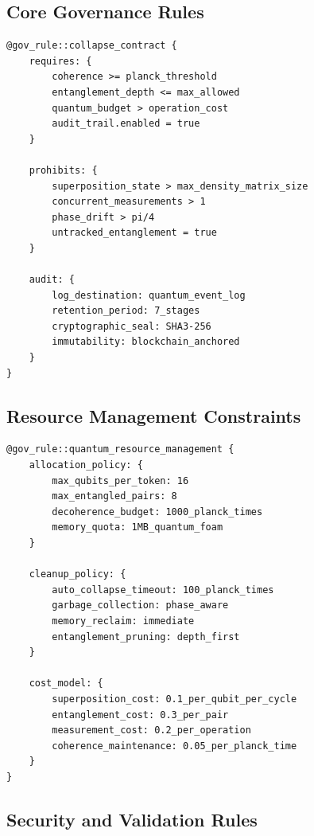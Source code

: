\documentclass[12pt,a4paper]{article}
\begin{document}
\subsection{Core Governance Rules}

\begin{lstlisting}[style=riftlang,caption={Collapse Contract Governance}]
@gov_rule::collapse_contract {
    requires: {
        coherence >= planck_threshold
        entanglement_depth <= max_allowed
        quantum_budget > operation_cost
        audit_trail.enabled = true
    }
    
    prohibits: {
        superposition_state > max_density_matrix_size
        concurrent_measurements > 1
        phase_drift > pi/4
        untracked_entanglement = true
    }
    
    audit: {
        log_destination: quantum_event_log
        retention_period: 7_stages
        cryptographic_seal: SHA3-256
        immutability: blockchain_anchored
    }
}
\end{lstlisting}

\subsection{Resource Management Constraints}

\begin{lstlisting}[style=riftlang,caption={Quantum Resource Governance}]
@gov_rule::quantum_resource_management {
    allocation_policy: {
        max_qubits_per_token: 16
        max_entangled_pairs: 8
        decoherence_budget: 1000_planck_times
        memory_quota: 1MB_quantum_foam
    }
    
    cleanup_policy: {
        auto_collapse_timeout: 100_planck_times
        garbage_collection: phase_aware
        memory_reclaim: immediate
        entanglement_pruning: depth_first
    }
    
    cost_model: {
        superposition_cost: 0.1_per_qubit_per_cycle
        entanglement_cost: 0.3_per_pair
        measurement_cost: 0.2_per_operation
        coherence_maintenance: 0.05_per_planck_time
    }
}
\end{lstlisting}

\subsection{Security and Validation Rules}
\end{document}
